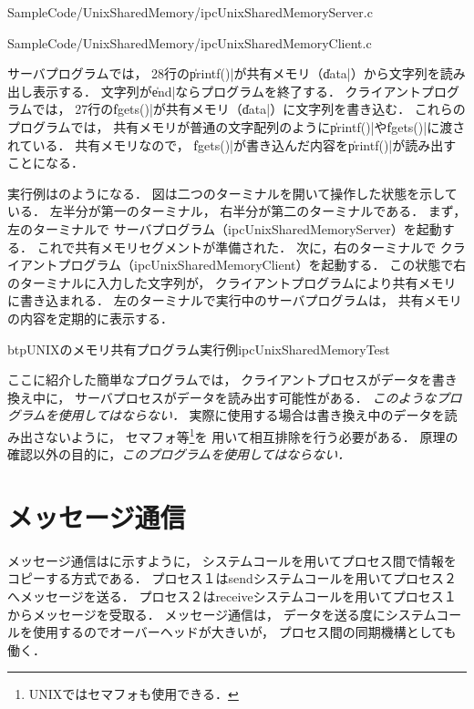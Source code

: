 
  {SampleCode/UnixSharedMemory/ipcUnixSharedMemoryServer.c}


  {SampleCode/UnixSharedMemory/ipcUnixSharedMemoryClient.c}

サーバプログラムでは，
28行の\|printf()|が共有メモリ（\|data|）から文字列を読み出し表示する．
文字列が\|end|ならプログラムを終了する．
クライアントプログラムでは，
27行の\|fgets()|が共有メモリ（\|data|）に文字列を書き込む．
これらのプログラムでは，
共有メモリが普通の文字配列のように\|printf()|や\|fgets()|に渡されている．
共有メモリなので，
\|fgets()|が書き込んだ内容を\|printf()|が読み出すことになる．

実行例はのようになる．
図は二つのターミナルを開いて操作した状態を示している．
左半分が第一のターミナル，
右半分が第二のターミナルである．
まず，左のターミナルで
サーバプログラム（ipcUnixSharedMemoryServer）を起動する．
これで共有メモリセグメントが準備された．
次に，右のターミナルで
クライアントプログラム（ipcUnixSharedMemoryClient）を起動する．
この状態で右のターミナルに入力した文字列が，
クライアントプログラムにより共有メモリに書き込まれる．
左のターミナルで実行中のサーバプログラムは，
共有メモリの内容を定期的に表示する．

\begin{myfig}{btp}{UNIXのメモリ共有プログラム実行例}{ipcUnixSharedMemoryTest}
  
\end{myfig}

ここに紹介した簡単なプログラムでは，
クライアントプロセスがデータを書き換え中に，
サーバプロセスがデータを読み出す可能性がある．
\emph{このようなプログラムを使用してはならない．}
実際に使用する場合は書き換え中のデータを読み出さないように，
セマフォ等\footnote{UNIXではセマフォも使用できる．}を
用いて相互排除を行う必要がある．
原理の確認以外の目的に，\emph{このプログラムを使用してはならない．}

\section{メッセージ通信}
メッセージ通信はに示すように，
システムコールを用いてプロセス間で情報をコピーする方式である．
プロセス１はsendシステムコールを用いてプロセス２へメッセージを送る．
プロセス２はreceiveシステムコールを用いてプロセス１からメッセージを受取る．
メッセージ通信は，
データを送る度にシステムコールを使用するのでオーバーヘッドが大きいが，
プロセス間の同期機構としても働く．

